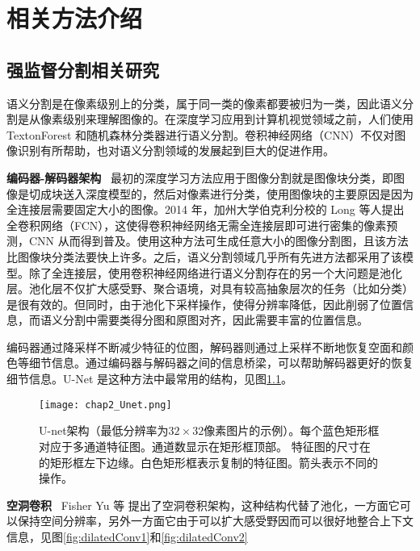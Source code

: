 \chapter{相关方法介绍}

\section{强监督分割相关研究}\label{sec:fullySeg}

语义分割是在像素级别上的分类，属于同一类的像素都要被归为一类，因此语义分割是从像素级别来理解图像的。在深度学习应用到计算机视觉领域之前，人们使用 TextonForest 和随机森林分类器进行语义分割。卷积神经网络（CNN）不仅对图像识别有所帮助，也对语义分割领域的发展起到巨大的促进作用。

\textbf{编码器-解码器架构}~
最初的深度学习方法应用于图像分割就是图像块分类，即图像是切成块送入深度模型的，然后对像素进行分类，使用图像块的主要原因是因为全连接层需要固定大小的图像。2014 年，加州大学伯克利分校的 Long 等人\cite{long2015fully}提出全卷积网络（FCN），这使得卷积神经网络无需全连接层即可进行密集的像素预测，CNN 从而得到普及。使用这种方法可生成任意大小的图像分割图，且该方法比图像块分类法要快上许多。之后，语义分割领域几乎所有先进方法都采用了该模型。除了全连接层，使用卷积神经网络进行语义分割存在的另一个大问题是池化层。池化层不仅扩大感受野、聚合语境，对具有较高抽象层次的任务（比如分类）是很有效的。但同时，由于池化下采样操作，使得分辨率降低，因此削弱了位置信息，而语义分割中需要类得分图和原图对齐，因此需要丰富的位置信息。

编码器通过降采样不断减少特征的位图，解码器则通过上采样不断地恢复空面和颜色等细节信息。通过编码器与解码器之间的信息桥梁，可以帮助解码器更好的恢复细节信息。U-Net\cite{ronneberger2015u} 是这种方法中最常用的结构，见图\ref{fig:chap2_Unet}。

\begin{figure}[h]
\begin{center}
\texttt{[image: chap2\_Unet.png]}
\end{center}
\caption{U-net架构\cite{ronneberger2015u}（最低分辨率为$32\times32$像素图片的示例）。每个蓝色矩形框对应于多通道特征图。通道数显示在矩形框顶部。 特征图的尺寸在的矩形框左下边缘。白色矩形框表示复制的特征图。箭头表示不同的操作。}
\label{fig:chap2_Unet}
\end{figure}

\textbf{空洞卷积}~
Fisher Yu 等\cite{yu2015multi} 提出了空洞卷积架构，这种结构代替了池化，一方面它可以保持空间分辨率，另外一方面它由于可以扩大感受野因而可以很好地整合上下文信息，见图\ref{fig:dilatedConv1}和\ref{fig:dilatedConv2}

